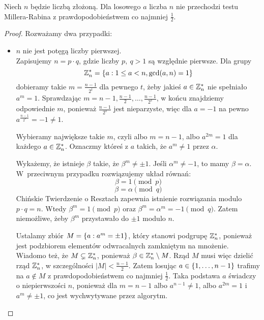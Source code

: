 \begin{lemma}
    Niech \( n \) będzie liczbą złożoną. Dla losowego \( a \) liczba \( n \) nie przechodzi testu Millera-Rabina z prawdopodobieństwem co najmniej \( \frac{1}{2} \).
\end{lemma}
\begin{proof}
    Rozważamy dwa przypadki:
    \begin{itemize}
        \item \( n \) nie jest potęgą liczby pierwszej. \\
        Zapisujemy \( n = p \cdot q \), gdzie liczby \( p, \ q > 1 \) są względnie pierwsze.    
        Dla grupy
        \[
            \integer_n^* = \set{a : 1 \le a < n, \gcd(a,n) = 1}
        \]    
        dobieramy takie \( m = \frac{n-1}{2^t} \) dla pewnego \( t \), żeby jakieś \( a \in \mathbb{Z}_n^* \) nie spełniało \( a^m = 1 \).
        Sprawdzając \( m = n-1, \frac{n-1}{2}, \dots, \frac{n-1}{2^s} \), w końcu znajdziemy odpowiednie \( m \), ponieważ \( \frac{n-1}{2^s} \) jest nieparzyste, więc dla \( a = -1\)  na pewno \( a^{\frac{n-1}{2^s}} = -1 \ne 1 \).

	    Wybieramy największe takie \( m \), czyli albo \( m = n - 1 \), albo \( a^{2m} = 1 \) dla każdego \( a \in \mathbb{Z}_n^* \). Oznaczmy któreś z \( a \) takich, że \( a^m \neq 1 \) przez \( \alpha \).
    
        Wykażemy, że istnieje \( \beta \) takie, że \( \beta^m \neq \pm 1 \). Jeśli \( \alpha^m \neq -1 \), to mamy \( \beta = \alpha \). W~przeciwnym przypadku rozwiązujemy układ równań:
        \[
            \beta = 1 \pmod{p}
        \]
        \[
            \beta = \alpha \pmod{q}
        \]
        Chińskie Twierdzenie o Resztach zapewnia istnienie rozwiązania modulo \( p \cdot q = n \). Wtedy \( \beta^m = 1 \pmod{p} \) oraz \( \beta^m = \alpha^m = -1 \pmod{q} \).
        Zatem niemożliwe, żeby \( \beta^m \) przystawało do \( \pm 1 \) modulo \( n \).
    
        Ustalamy zbiór \( M = \set{a : a^m = \pm 1} \), który stanowi podgrupę \( \mathbb{Z}_n^* \), ponieważ jest podzbiorem elementów odwracalnych zamkniętym na mnożenie.
        Wiadomo też, że \( M \subsetneq \mathbb{Z}_n^* \), ponieważ \( \beta \in \mathbb{Z}_n^* \setminus M \). Rząd \( M \) musi więc dzielić rząd \( \mathbb{Z}_n^* \), w szczególności \( |M| < \frac{n-1}{2} \).
        Zatem losując \( a \in \set{1, \dots, n-1} \) trafimy na \( a \notin M \) z prawdopodobieństwem co najmniej \( \frac{1}{2} \). Taka podstawa \( a \) świadczy o niepierwszości \( n \), ponieważ dla \( m = n-1 \) albo \( a^{n-1} \neq 1 \), albo \( a^{2m} = 1 \) i \( a^m \neq \pm 1 \), co jest wychwytywane przez algorytm.
        

\end{itemize}
\end{proof}
